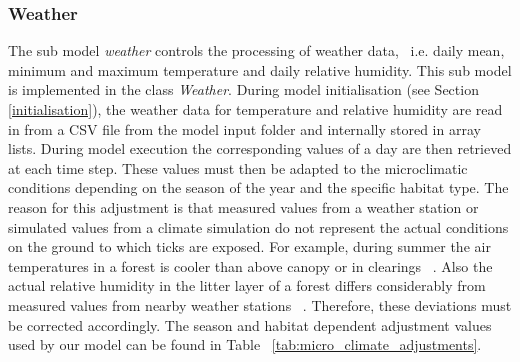 \documentclass[a4paper, 11pt]{scrartcl}
\begin{document}
\subsubsection{Weather}
The sub model \emph{weather} controls the processing of weather data, ~i.e. daily mean, minimum and maximum temperature and daily relative humidity. This sub model is implemented in the class \emph{Weather}. During model initialisation (see Section \ref{initialisation}), the weather data for temperature and relative humidity are read in from a CSV file from the model input folder and internally stored in array lists. During model execution the corresponding values of a day are then retrieved at each time step. These values must then be adapted to the microclimatic conditions depending on the season of the year and the specific habitat type. The reason for this adjustment is that measured values from a weather station or simulated values from a climate simulation do not represent the actual conditions on the ground to which ticks are exposed. For example, during summer the air temperatures in a forest is cooler than above canopy or in clearings ~\cite{Bonan.2016, Geiger.1995}. Also the actual relative humidity in the litter layer of a forest differs considerably from measured values from nearby weather stations ~\cite{Boehnke.2017}. Therefore, these deviations must be corrected accordingly. The season and habitat dependent adjustment values used by our model can be found in Table ~\ref{tab:micro_climate_adjustments}.
\end{document}
